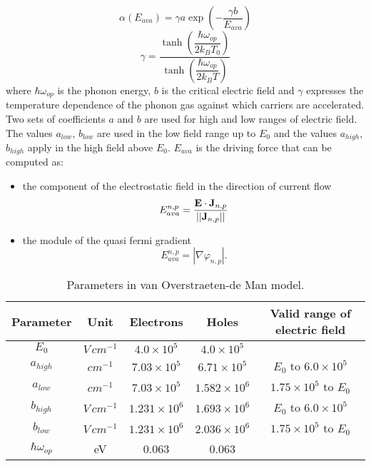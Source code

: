 \begin{equation}
\alpha(E_{ava}) = \gamma a \exp\left(-\dfrac{\gamma b}{E_{ava}} \right)
\end{equation} 
\begin{equation}
\gamma = \dfrac{\tanh\left(\dfrac{\hbar \omega_{op}}{2k_BT_0} \right) }{\tanh\left(\dfrac{\hbar \omega_{op}}{2k_BT} \right)}
\end{equation}
where $\hbar \omega_{op}$ is the phonon energy, $b$ is the critical electric field and $\gamma$ expresses the temperature dependence of the phonon gas against which carriers are accelerated. Two sets of coefficients $a$ and $b$ are used for high and low ranges of electric field. The values $a_{low}$, $b_{low}$ are used in the low field range up to $E_{0}$ and the values $a_{high}$, $b_{high}$ apply in the high field above $E_0$. $E_{ava}$ is the driving force that can be computed as:
\begin{itemize}
\item the component of the electrostatic field in the direction of current flow
\begin{equation}
E_{ava}^{n,p} = \dfrac{\mathbf{E}\cdot\mathbf{J}_{n,p}}{||\mathbf{J}_{n,p}||}
\end{equation}
\item the module of the quasi fermi gradient
\begin{equation}
E_{ava}^{n,p} = |\nabla \varphi_{n,p}|.
\end{equation}
\end{itemize}

\begin{table}[!h]
\centering
\begin{tabular}{ccccc}
\toprule
Parameter & Unit & Electrons & Holes  & Valid range of electric field\\
\midrule
$E_0$ & $V \, cm^{-1}$ & $4.0 \times 10^{5}$ & $4.0 \times 10^{5}$ & \\
$a_{high}$ & $cm^{-1}$ & $7.03 \times 10^{5}$ & $6.71 \times 10^{5}$ & $E_0$ to $6.0 \times 10^{5}$\\
$a_{low}$ & $cm^{-1}$ & $7.03 \times 10^{5}$ & $1.582 \times 10^{6}$ & $1.75 \times 10^{5}$ to $E_0$\\
$b_{high}$ & $V \, cm^{-1}$ & $1.231 \times 10^{6}$ & $1.693 \times 10^{6}$ & $E_0$ to $6.0 \times 10^{5}$\\
$b_{low}$ & $V \, cm^{-1}$ & $1.231 \times 10^{6}$ & $2.036 \times 10^{6}$ &$1.75 \times 10^{5}$ to $E_0$\\
$\hbar\omega_{op}$ & eV & 0.063 & 0.063\\
\bottomrule
\end{tabular}
\caption{Parameters in van Overstraeten-de Man model.}
\end{table}



